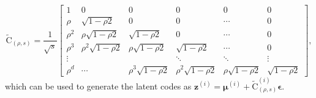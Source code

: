 \documentclass{article}
\begin{document}
\begin{equation}    \label{eq:rho_chol}
\tilde{\mathrm{C}}_{(\rho,s)} = \frac{1}{\sqrt{s}} \begin{bmatrix}
    1          & 0        & 0     & 0       & 0   & 0 \\
    \rho       & \sqrt{1-\rho 2}           & 0       & 0       & \cdots   & 0 \\
    \rho^2     & \rho\sqrt{1-\rho 2}        & \sqrt{1-\rho 2}          & 0         & \cdots   & 0 \\
    \rho^3     & \rho^2\sqrt{1-\rho 2}      & \rho\sqrt{1-\rho 2}       & \sqrt{1-\rho 2}           & \cdots   & 0 \\
    \vdots     &       &       & \ddots       & \ddots   & \vdots      \\
    \rho^{d} & \cdots  & \rho^3 \sqrt{1-\rho 2} & \rho^2 \sqrt{1-\rho 2}   & \rho \sqrt{1-\rho 2}   & \sqrt{1-\rho 2}
  \end{bmatrix},
\end{equation}
which can be used to generate the latent codes as $\mathbf{z}^{(i)} = \boldsymbol{\mu}^{(i)} + \tilde{\mathrm{C}}_{(\rho,s)}^{(i)} \boldsymbol{\epsilon}$. 





\end{document}
